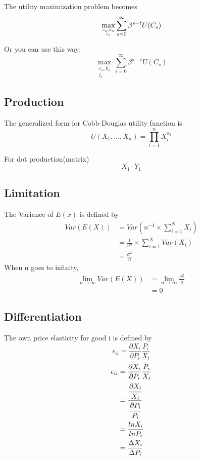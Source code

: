 \documentclass[11pt]{article}
\newcommand{\infinity}{\infty}
\begin{document}
        $$$$
        The utility maximization problem becomes
        $$ \max_{c_s,k_s \atop l_s} \sum_{s = 0} ^\infinity {\beta^{s-t} U(C_s)}$$

        Or you can use this way:
        $$ \max_{\substack{c_s, k_s\\l_s}} \sum_{s = 0} ^\infinity {\beta^{s-t}U(C_s)} $$

        
        \subsection{Production}
        The generalized form for Cobb-Douglas utility function is
        $$ U(X_1,...,X_n) = \prod_{i = 1} ^n X_i^{\alpha_i} $$

        For dot production(matrix)
        $$ X_1 \cdot Y_1$$


        \subsection{Limitation}         
        The Variance of $E(x)$ is defined by
        \begin{align*}
            Var(E(X)) &= Var (n^{-1} \times \sum_{i = 1} ^N {X_i})\\
            & = \frac{1}{n^2} \times \sum_{i = 1} ^N {Var({X_i})}\\
            & = \frac{\sigma^2}{n}
        \end{align*}
        When n goes to infinity,
        \begin{align*}
            \lim_{n \to \infinity} Var(E(X)) & = \lim_{n \to \infinity} \frac{\sigma^2}{n}\\
            & = 0
        \end{align*}

        
        \subsection{Differentiation}
        The own price elasticity for good i is defined by
        $$ \epsilon_{ii} = \frac{\partial X_i}{\partial P_i} \frac{P_i}{X_i}$$
        \begin{align*}
            \epsilon_{ii} &= \frac{\partial X_i}{\partial P_i} \frac{P_i}{X_i}\\
            & = \cfrac{\cfrac{\partial X_i}{X_i}} {\cfrac{\partial P_i}{P_i}}\\
            & = \frac{lnX_i}{lnP_i}\\
            & = \frac{\Delta X_i}{\Delta P_i}
        \end{align*}
        
\end{document}
